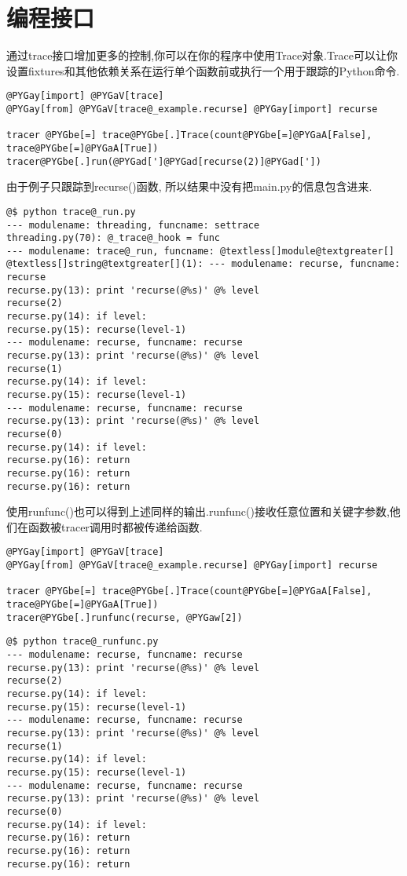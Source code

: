 \documentclass[a4paper,10pt,english]{manual}
\begin{document}
\section{编程接口}

通过trace接口增加更多的控制,你可以在你的程序中使用Trace对象.Trace可以让你设置fixtures和其他依赖关系在运行单个函数前或执行一个用于跟踪的Python命令.

\begin{Verbatim}[commandchars=@\[\]]
@PYGay[import] @PYGaV[trace]
@PYGay[from] @PYGaV[trace@_example.recurse] @PYGay[import] recurse

tracer @PYGbe[=] trace@PYGbe[.]Trace(count@PYGbe[=]@PYGaA[False], trace@PYGbe[=]@PYGaA[True])
tracer@PYGbe[.]run(@PYGad[']@PYGad[recurse(2)]@PYGad['])
\end{Verbatim}

由于例子只跟踪到recurse()函数, 所以结果中没有把main.py的信息包含进来.

\begin{Verbatim}[commandchars=@\[\]]
@$ python trace@_run.py
--- modulename: threading, funcname: settrace
threading.py(70): @_trace@_hook = func
--- modulename: trace@_run, funcname: @textless[]module@textgreater[]
@textless[]string@textgreater[](1): --- modulename: recurse, funcname: recurse
recurse.py(13): print 'recurse(@%s)' @% level
recurse(2)
recurse.py(14): if level:
recurse.py(15): recurse(level-1)
--- modulename: recurse, funcname: recurse
recurse.py(13): print 'recurse(@%s)' @% level
recurse(1)
recurse.py(14): if level:
recurse.py(15): recurse(level-1)
--- modulename: recurse, funcname: recurse
recurse.py(13): print 'recurse(@%s)' @% level
recurse(0)
recurse.py(14): if level:
recurse.py(16): return
recurse.py(16): return
recurse.py(16): return
\end{Verbatim}

使用runfunc()也可以得到上述同样的输出.runfunc()接收任意位置和关键字参数,他们在函数被tracer调用时都被传递给函数.

\begin{Verbatim}[commandchars=@\[\]]
@PYGay[import] @PYGaV[trace]
@PYGay[from] @PYGaV[trace@_example.recurse] @PYGay[import] recurse

tracer @PYGbe[=] trace@PYGbe[.]Trace(count@PYGbe[=]@PYGaA[False], trace@PYGbe[=]@PYGaA[True])
tracer@PYGbe[.]runfunc(recurse, @PYGaw[2])
\end{Verbatim}

\begin{Verbatim}[commandchars=@\[\]]
@$ python trace@_runfunc.py
--- modulename: recurse, funcname: recurse
recurse.py(13): print 'recurse(@%s)' @% level
recurse(2)
recurse.py(14): if level:
recurse.py(15): recurse(level-1)
--- modulename: recurse, funcname: recurse
recurse.py(13): print 'recurse(@%s)' @% level
recurse(1)
recurse.py(14): if level:
recurse.py(15): recurse(level-1)
--- modulename: recurse, funcname: recurse
recurse.py(13): print 'recurse(@%s)' @% level
recurse(0)
recurse.py(14): if level:
recurse.py(16): return
recurse.py(16): return
recurse.py(16): return
\end{Verbatim}
\end{document}
